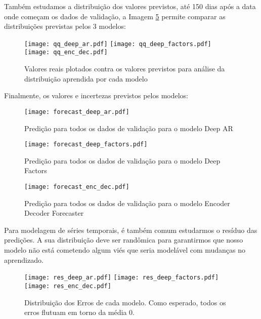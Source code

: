 Também estudamos a distribuição dos valores previstos, até 150 dias após a data onde começam os dados de validação, a Imagem \ref{fig:distr} permite comparar as distribuições previstas pelos 3 modelos:

\begin{figure}[H]
\label{fig:distr}
\centering
\texttt{[image: qq\_deep\_ar.pdf]} \hfill
\texttt{[image: qq\_deep\_factors.pdf]} \hfill
\texttt{[image: qq\_enc\_dec.pdf]} 
\caption{Valores reais plotados contra os valores previstos para análise da distribuição aprendida por cada modelo} 
\end{figure}


Finalmente, os valores e incertezas previstos pelos modelos:


\begin{figure}[H]
  \label{fig:fordeepar}
  \centering
\texttt{[image: forecast\_deep\_ar.pdf]} 
\caption{Predição para todos os dados de validação para o modelo Deep AR}
\end{figure}

\begin{figure}[H]
  \label{fig:fordeepfactors}
  \centering
\texttt{[image: forecast\_deep\_factors.pdf]} 
\caption{Predição para todos os dados de validação para o modelo Deep Factors}
\end{figure}

\begin{figure}[H]
  \label{fig:forencdec}
  \centering
\texttt{[image: forecast\_enc\_dec.pdf]} 
\caption{Predição para todos os dados de validação para o modelo Encoder Decoder Forecaster} 
\end{figure}


Para modelagem de séries temporais, é também comum estudarmos o resíduo das predições. A sua distribuição deve ser randômica para garantirmos que nosso modelo não está cometendo algum viés que seria
modelável com mudanças no aprendizado. \\


\begin{figure}[H]
\label{fig:distr}
\centering
\texttt{[image: res\_deep\_ar.pdf]} \hfill
\texttt{[image: res\_deep\_factors.pdf]} \hfill
\texttt{[image: res\_enc\_dec.pdf]} 
\caption{Distribuição dos Erros de cada modelo. Como esperado, todos os erros flutuam em torno da média 0. } 
\end{figure}



